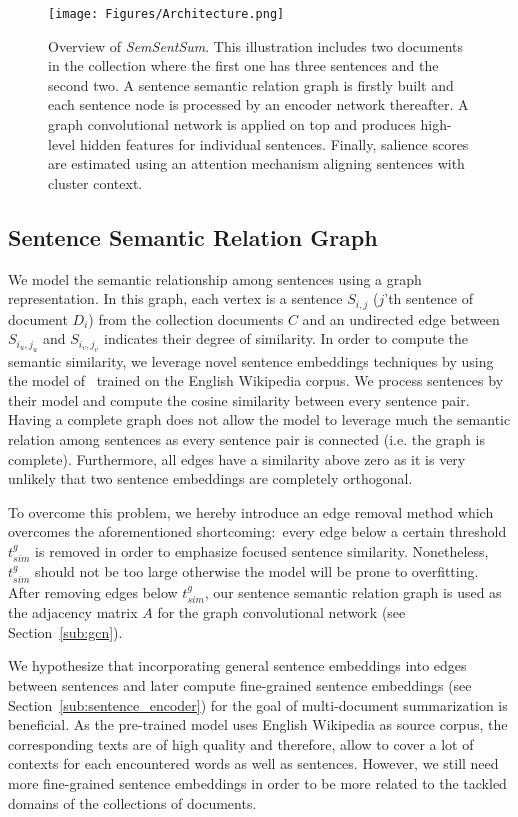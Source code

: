 \documentclass{article}
\begin{document}
\begin{figure}
  \centering
  \texttt{[image: Figures/Architecture.png]}
  \caption{Overview of \textit{SemSentSum}. This illustration includes two documents in the collection where the first one has three sentences and the second two. A sentence semantic relation graph is firstly built and each sentence node is processed by an encoder network thereafter. A graph convolutional network is applied on top and produces high-level hidden features for individual sentences. Finally, salience scores are estimated using an attention mechanism aligning sentences with cluster context.}
  \label{fig:architecture}
\end{figure}

\subsection{Sentence Semantic Relation Graph}
\label{ssrg}
We model the semantic relationship among sentences using a graph representation. In this graph, each vertex is a sentence $S_{i,j}$ ($j$'th sentence of document $D_i$) from the collection documents $C$ and an undirected edge between $S_{i_u,j_u}$ and $S_{i_v,j_v}$ indicates their degree of similarity.
In order to compute the semantic similarity, we leverage novel sentence embeddings techniques by using the model of~\citet{pgj2017unsup} trained on the English Wikipedia corpus. We process sentences by their model and compute the cosine similarity between every sentence pair. Having a complete graph does not allow the model to leverage much the semantic relation among sentences as every sentence pair is connected (i.e. the graph is complete). Furthermore, all edges have a similarity above zero as it is very unlikely that two sentence embeddings are completely orthogonal.

To overcome this problem, we hereby introduce an edge removal method which overcomes the aforementioned shortcoming:~every edge below a certain threshold $t_{sim}^g$ is removed in order to emphasize focused sentence similarity. Nonetheless, $t_{sim}^g$ should not be too large otherwise the model will be prone to overfitting. After removing edges below $t_{sim}^g$, our sentence semantic relation graph is used as the adjacency matrix $A$ for the graph convolutional network (see Section~\ref{sub:gcn}).

We hypothesize that incorporating general sentence embeddings into edges between sentences and later compute fine-grained sentence embeddings (see Section~\ref{sub:sentence_encoder}) for the goal of multi-document summarization is beneficial. As the pre-trained model uses English Wikipedia as source corpus, the corresponding texts are of high quality and therefore, allow to cover a lot of contexts for each encountered words as well as sentences. However, we still need more fine-grained sentence embeddings in order to be more related to the tackled domains of the collections of documents.
\end{document}
